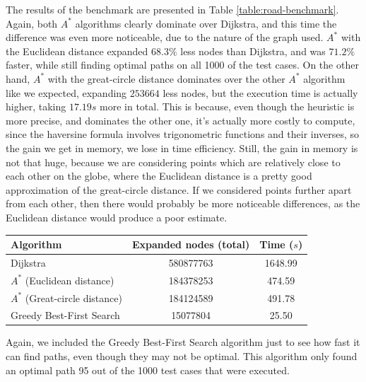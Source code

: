 \documentclass[a4paper,10pt]{report}
\begin{document}
The results of the benchmark are presented in Table \ref{table:road-benchmark}. Again, both $A^*$ algorithms clearly dominate over Dijkstra, and this time the difference was even more noticeable, due to the nature of the graph used. $A^*$ with the Euclidean distance expanded $68.3\%$ less nodes than Dijkstra, and was $71.2\%$ faster, while still finding optimal paths on all 1000 of the test cases. On the other hand, $A^*$ with the great-circle distance dominates over the other $A^*$ algorithm like we expected, expanding $253664$ less nodes, but the execution time is actually higher, taking $17.19 s$ more in total. This is because, even though the heuristic is more precise, and dominates the other one, it's actually more costly to compute, since the haversine formula involves trigonometric functions and their inverses, so the gain we get in memory, we lose in time efficiency. Still, the gain in memory is not that huge, because we are considering points which are relatively close to each other on the globe, where the Euclidean distance is a pretty good approximation of the great-circle distance. If we considered points further apart from each other, then there would probably be more noticeable differences, as the Euclidean distance would produce a poor estimate.

\begin{center}
	\begin{tabular}{lcc}
	\label{table:road-benchmark}
	Algorithm & Expanded nodes (total) & Time ($s$)  \\
	\hline
	Dijkstra & 580877763 & 1648.99 \\
	$A^*$ (Euclidean distance) & 184378253 & 474.59 \\
	$A^*$ (Great-circle distance) & 184124589 & 491.78 \\
	Greedy Best-First Search & 15077804 & 25.50 \\
	\end{tabular}
\end{center}

Again, we included the Greedy Best-First Search algorithm just to see how fast it can find paths, even though they may not be optimal. This algorithm only found an optimal path 95 out of the 1000 test cases that were executed.
\end{document}
